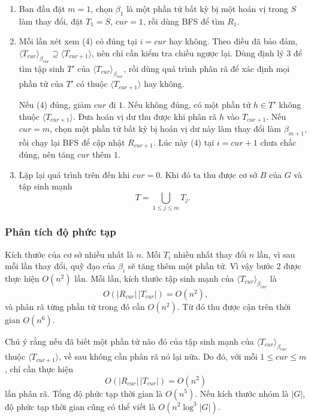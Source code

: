 \documentclass[11pt]{article}
\begin{document}
\begin{enumerate}
  \item Ban đầu đặt \(m=1\), chọn \(\beta_1\) là một phần tử bất kỳ bị một hoán
  vị trong \(S\) làm thay đổi, đặt \(T_1=S\), \(\mathit{cur}=1\), rồi dùng BFS
  để tìm \(R_1\).

  \item Mỗi lần xét xem (4) có đúng tại \(i=\mathit{cur}\) hay không. Theo điều
  đã bảo đảm, \(\langle T_{\mathit{cur}}\rangle_{\beta_{\mathit{cur}}}
  \supseteq\langle T_{\mathit{cur}+1}\rangle\), nên chỉ cần kiểm tra chiều
  ngược lại. Dùng định lý 3 để tìm tập sinh \(T'\) của
  \(\langle T_{\mathit{cur}}\rangle_{\beta_{\mathit{cur}}}\), rồi dùng quá
  trình phân rã để xác định mọi phần tử của \(T'\) có thuộc
  \(\langle T_{\mathit{cur}+1}\rangle\) hay không.

  Nếu (4) đúng, giảm \(\mathit{cur}\) đi \(1\). Nếu không đúng, có một phần tử
  \(h\in T'\) không thuộc \(\langle T_{\mathit{cur}+1}\rangle\). Đưa hoán vị dư
  thu được khi phân rã \(h\) vào \(T_{\mathit{cur}+1}\). Nếu
  \(\mathit{cur}=m\), chọn một phần tử bất kỳ bị hoán vị dư này làm thay đổi
  làm \(\beta_{m+1}\), rồi chạy lại BFS để cập nhật \(R_{\mathit{cur}+1}\).
  Lúc này (4) tại \(i=\mathit{cur}+1\) chưa chắc đúng, nên tăng
  \(\mathit{cur}\) thêm \(1\).

  \item Lặp lại quá trình trên đến khi \(\mathit{cur}=0\). Khi đó ta thu được
  cơ sở \(B\) của \(G\) và tập sinh mạnh
  \[
    T=\bigcup_{1\le j\le m}T_j.
  \]
\end{enumerate}

\subsubsection{Phân tích độ phức tạp}

Kích thước của cơ sở nhiều nhất là \(n\). Mỗi \(T_i\) nhiều nhất thay đổi
\(n\) lần, vì sau mỗi lần thay đổi, quỹ đạo của \(\beta_i\) sẽ tăng thêm một
phần tử. Vì vậy bước 2 được thực hiện \(O(n^2)\) lần. Mỗi lần, kích thước tập
sinh mạnh của \(\langle T_{\mathit{cur}}\rangle_{\beta_{\mathit{cur}}}\) là
\[
  O(|R_{\mathit{cur}}|\,|T_{\mathit{cur}}|)=O(n^2),
\]
và phân rã từng phần tử trong đó cần \(O(n^2)\). Từ đó thu được cận trên thời
gian \(O(n^6)\).

Chú ý rằng nếu đã biết một phần tử nào đó của tập sinh mạnh của
\(\langle T_{\mathit{cur}}\rangle_{\beta_{\mathit{cur}}}\) thuộc
\(\langle T_{\mathit{cur}+1}\rangle\), về sau không cần phân rã nó lại nữa.
Do đó, với mỗi \(1\le\mathit{cur}\le m\), chỉ cần thực hiện
\[
  O(|R_{\mathit{cur}}|\,|T_{\mathit{cur}}|)=O(n^2)
\]
lần phân rã. Tổng độ phức tạp thời gian là \(O(n^5)\). Nếu kích thước nhóm là
\(|G|\), độ phức tạp thời gian cũng có thể viết là \(O(n^2\log^3|G|)\).
\end{document}
